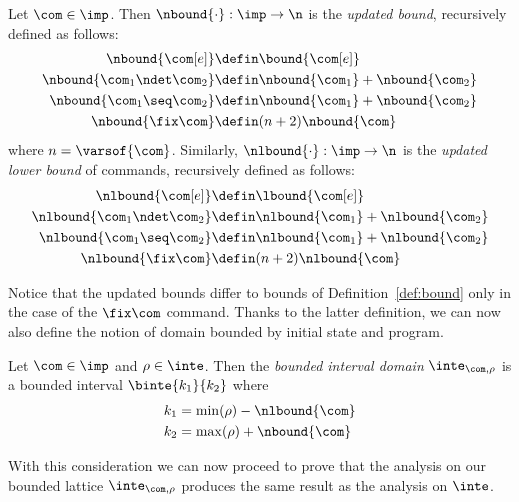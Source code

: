 \begin{definition}\label{def:newbound}
  Let \(\com\in\imp\). Then \(\nbound{\cdot} : \imp \to \n\) is the
  \emph{updated bound}, recursively defined as follows:
  \begin{align*}
    \nbound{\com[e]} & \defin \bound{\com[e]} \\
    \nbound{\com_1 \ndet \com_2} & \defin \nbound{\com_1} + \nbound{\com_2} \\
    \nbound{\com_1 \seq \com_2} & \defin \nbound{\com_1} + \nbound{\com_2} \\
    \nbound{\fix\com} & \defin (n+2)\nbound{\com} \\
  \end{align*}
  where \(n = \varsof{\com}\). Similarly,
  \(\nlbound{\cdot} : \imp \to \n\) is the \emph{updated lower bound}
  of commands, recursively defined as follows:
  \begin{align*}
    \nlbound{\com[e]} & \defin \lbound{\com[e]} \\
    \nlbound{\com_1 \ndet \com_2} & \defin \nlbound{\com_1} + \nlbound{\com_2} \\
    \nlbound{\com_1 \seq \com_2} & \defin \nlbound{\com_1} + \nlbound{\com_2} \\
    \nlbound{\fix\com} & \defin (n+2)\nlbound{\com} \\
  \end{align*}
\end{definition}

Notice that the updated bounds differ to bounds of
Definition~\ref{def:bound} only in the case of the \(\fix\com\)
command.  Thanks to the latter definition, we can now also define the
notion of domain bounded by initial state and program.

\begin{definition}\label{def:boundedbycom}
  Let \(\com\in\imp\) and \(\rho \in \inte\). Then the \emph{bounded
    interval domain} \(\inte_{\com,\rho}\) is a bounded interval
  \(\binte{k_1}{k_2}\) where
  \begin{align*}
    k_1 & = \min(\rho) - \nlbound{\com} \\
    k_2 & = \max(\rho) + \nbound{\com}
  \end{align*}
\end{definition}

With this consideration we can now proceed to prove that the analysis
on our bounded lattice \(\inte_{\com,\rho}\) produces the same result
as the analysis on \(\inte\).

